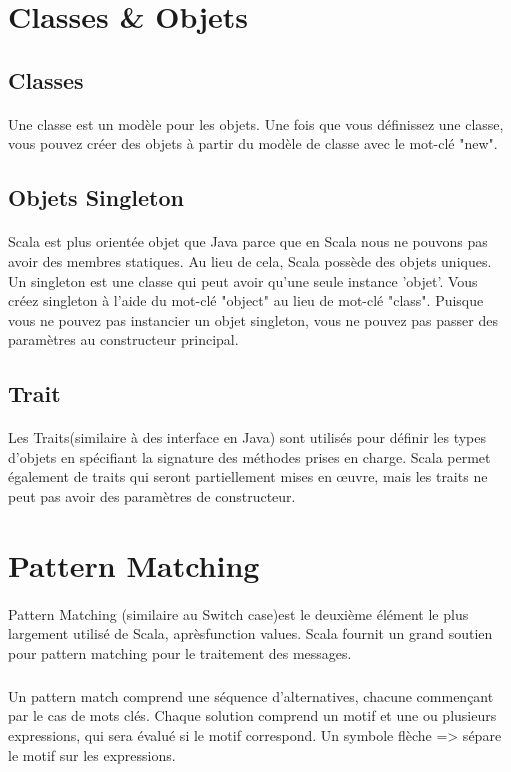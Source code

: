 \section{Classes \& Objets}
\subsection{Classes}
\paragraph{}
Une classe est un modèle pour les objets. Une fois que vous définissez une classe, vous pouvez créer des objets à partir du modèle de classe avec le mot-clé "new".
\subsection{Objets Singleton}
\paragraph{}
Scala est plus orientée objet que Java parce que en Scala nous ne pouvons pas avoir des membres statiques. Au lieu de cela, Scala possède des objets uniques. Un singleton est une classe qui peut avoir qu'une seule instance 'objet'. Vous créez singleton à l'aide du mot-clé "object" au lieu de mot-clé "class". Puisque vous ne pouvez pas instancier un objet singleton, vous ne pouvez pas passer des paramètres au constructeur principal.
\subsection{Trait}
\paragraph{}
Les Traits(similaire à des interface en Java) sont utilisés pour définir les types d'objets en spécifiant la signature des méthodes prises en charge. Scala permet également de traits qui seront partiellement mises en œuvre, mais les traits ne peut pas avoir des paramètres de constructeur.
\section{Pattern Matching}
\paragraph{}
Pattern Matching (similaire au Switch case)est le deuxième élément le plus largement utilisé de Scala, aprèsfunction values. Scala fournit un grand soutien pour pattern matching pour le traitement des messages.
\subparagraph{}
Un pattern match comprend une séquence d'alternatives, chacune commençant par le cas de mots clés. Chaque solution comprend un motif et une ou plusieurs expressions, qui sera évalué si le motif correspond. Un symbole flèche => sépare le motif sur les expressions.
